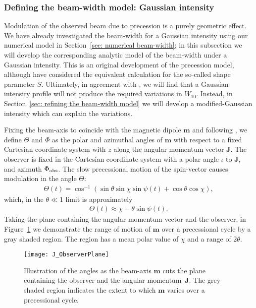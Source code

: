 \documentclass[../full_thesis/full_thesis.tex]{subfiles}
\begin{document}
\subsubsection{Defining the beam-width model: Gaussian intensity}

Modulation of the observed beam due to precession is a purely geometric effect.
We have already investigated the beam-width for a Gaussian intensity using our
numerical model in Section~\ref{sec: numerical beam-width}; in this subsection
we will develop the corresponding analytic model of the beam-width under a
Gaussian intensity. This is an original development of the precession model,
although \citet{Akgun2006} have considered the equivalent calculation for the
so-called shape parameter $S$. Ultimately, in agreement with \citet{Akgun2006},
we will find that a Gaussian intensity profile will not produce the required
variations in $W_{10}$. Instead, in Section~\ref{sec: refining the beam-width
model} we will develop a modified-Gaussian intensity which can explain the
variations.

Fixing the beam-axis to coincide with the magnetic dipole $\mathbf{m}$ and
following \citet{Jones2001}, we define $\Theta$ and $\Phi$ as the polar and
azimuthal angles of $\mathbf{m}$ with respect to a fixed Cartesian coordinate
system with $z$ along the angular momentum vector $\textbf{J}$. The observer is
fixed in the Cartesian coordinate system with a polar angle $\iota$ to $\textbf{J}$, and
azimuth $\Phi_{\mathrm{obs}}$. The slow precessional motion of the spin-vector causes modulation
in the angle $\Theta$:
\begin{align}
\Theta(t) = \cos^{-1}\left(\sin\theta\sin\chi\sin\psi(t) + \cos\theta\cos\chi\right),
\label{eqn: Theta}
\end{align}
which, in the $\theta \ll 1$ limit is approximately
\begin{align}
\Theta(t) \approx \chi - \theta \sin\psi(t).
\end{align}
Taking the plane containing the angular momentum vector and the observer, in
Figure~\ref{fig: J observer plane} we demonstrate the range of motion of
$\mathbf{m}$ over a precessional cycle by a gray shaded region.  The region has
a mean polar value of $\chi$ and a range of $2\theta$.
\begin{figure}[htb]
\centering \texttt{[image: J\_ObserverPlane]}
\caption{Illustration of the angles as the beam-axis $\mathbf{m}$ cuts the
         plane containing the observer and the angular momentum~$\mathbf{J}$.
         The grey shaded region indicates the extent to which $\mathbf{m}$
         varies over a precessional cycle.}
\label{fig: J observer plane}
\end{figure}
\end{document}
